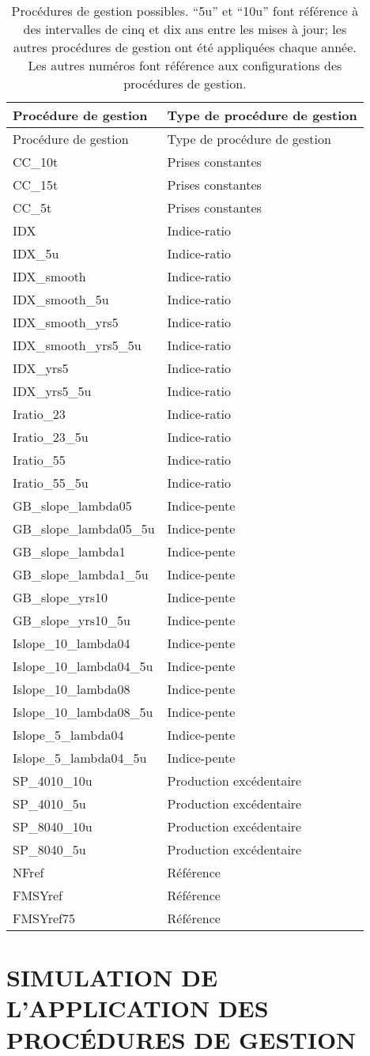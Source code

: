 \documentclass[french,11pt]{book}
\begin{document}
\clearpage
\begin{longtable}[]{@{}ll@{}}
\caption{\label{tab:mps}Procédures de gestion possibles. ``5u'' et ``10u'' font référence à des intervalles de cinq et dix ans entre les mises à jour; les autres procédures de gestion ont été appliquées chaque année. Les autres numéros font référence aux configurations des procédures de gestion.}\tabularnewline
\toprule
Procédure de gestion & Type de procédure de gestion\tabularnewline
\midrule
\endfirsthead
\toprule
Procédure de gestion & Type de procédure de gestion\tabularnewline
\midrule
\endhead
CC\_10t & Prises constantes\tabularnewline
CC\_15t & Prises constantes\tabularnewline
CC\_5t & Prises constantes\tabularnewline
IDX & Indice-ratio\tabularnewline
IDX\_5u & Indice-ratio\tabularnewline
IDX\_smooth & Indice-ratio\tabularnewline
IDX\_smooth\_5u & Indice-ratio\tabularnewline
IDX\_smooth\_yrs5 & Indice-ratio\tabularnewline
IDX\_smooth\_yrs5\_5u & Indice-ratio\tabularnewline
IDX\_yrs5 & Indice-ratio\tabularnewline
IDX\_yrs5\_5u & Indice-ratio\tabularnewline
Iratio\_23 & Indice-ratio\tabularnewline
Iratio\_23\_5u & Indice-ratio\tabularnewline
Iratio\_55 & Indice-ratio\tabularnewline
Iratio\_55\_5u & Indice-ratio\tabularnewline
GB\_slope\_lambda05 & Indice-pente\tabularnewline
GB\_slope\_lambda05\_5u & Indice-pente\tabularnewline
GB\_slope\_lambda1 & Indice-pente\tabularnewline
GB\_slope\_lambda1\_5u & Indice-pente\tabularnewline
GB\_slope\_yrs10 & Indice-pente\tabularnewline
GB\_slope\_yrs10\_5u & Indice-pente\tabularnewline
Islope\_10\_lambda04 & Indice-pente\tabularnewline
Islope\_10\_lambda04\_5u & Indice-pente\tabularnewline
Islope\_10\_lambda08 & Indice-pente\tabularnewline
Islope\_10\_lambda08\_5u & Indice-pente\tabularnewline
Islope\_5\_lambda04 & Indice-pente\tabularnewline
Islope\_5\_lambda04\_5u & Indice-pente\tabularnewline
SP\_4010\_10u & Production excédentaire\tabularnewline
SP\_4010\_5u & Production excédentaire\tabularnewline
SP\_8040\_10u & Production excédentaire\tabularnewline
SP\_8040\_5u & Production excédentaire\tabularnewline
NFref & Référence\tabularnewline
FMSYref & Référence\tabularnewline
FMSYref75 & Référence\tabularnewline
\bottomrule
\end{longtable}
\clearpage

\hypertarget{sec:simulation}{%
\section{SIMULATION DE L'APPLICATION DES PROCÉDURES DE GESTION}\label{sec:simulation}}
\end{document}
